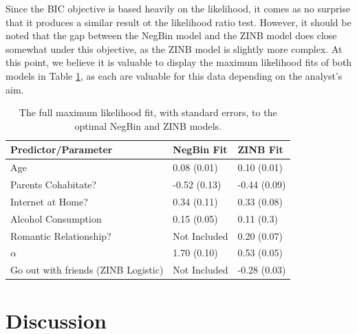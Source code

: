 \documentclass[12pt, titlepage]{article}
\begin{document}
	Since the BIC objective is based heavily on the likelihood, it comes as no surprise that it produces a similar result ot the likelihood ratio test. However, it should be noted that the gap between the NegBin model and the ZINB model does close somewhat under this objective, as the ZINB model is slightly more complex. At this point, we believe it is valuable to display the maximum likelihood fits of both models in Table \ref{MLE}, as each are valuable for this data depending on the analyst's aim. 
	\begin{table}[h!]
		\centering
		\begin{tabular}{|l|l|l|}
			\hline
			Predictor/Parameter & NegBin Fit & ZINB Fit \\
			\hline 
			Age & 0.08 (0.01) & 0.10 (0.01)\\
			Parents Cohabitate? & -0.52 (0.13) & -0.44 (0.09) \\
			Internet at Home? & 0.34 (0.11) & 0.33 (0.08) \\
			Alcohol Consumption& 0.15 (0.05) & 0.11 (0.3) \\
			Romantic Relationship?& Not Included & 0.20 (0.07) \\
			$\alpha$ & 1.70 (0.10) & 0.53 (0.05) \\
			Go out with friends (ZINB Logistic) & Not Included & -0.28 (0.03) \\
			\hline
		\end{tabular}
		\caption{The full maximum likelihood fit, with standard errors, to the optimal NegBin and ZINB models.}
		\label{MLE}
	\end{table}
	\section{Discussion}
	
\end{document}
